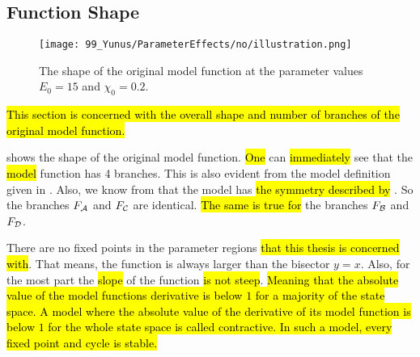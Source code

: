 \subsection{Function Shape}

\begin{figure}
	\centering
	\texttt{[image: 99\_Yunus/ParameterEffects/no/illustration.png]}
	\caption[Shape of the original model function]{
		The shape of the original model function at the parameter values $E_0 = 15$ and $\chi_0 = 0.2$.
	}
	\label{fig:setup.char.shape}
\end{figure}

\hl{
	This section is concerned with the overall shape and number of branches of the original model function.
}

 shows the shape of the original model function.
\hl{One} can \hl{immediately} see that the \hl{model} function has 4 branches.
This is also evident from the model definition given in .
Also, we know from  that the model has \hl{the symmetry described by} .
So the branches $F_{\mathcal{A}}$ and $F_{\mathcal{C}}$ are identical.
\hl{The same is true for} the branches $F_{\mathcal{B}}$ and $F_{\mathcal{D}}$.

There are no fixed points in the parameter regions \hl{that this thesis is concerned with}.
That means, the function is always larger than the bisector $y=x$.
Also, for the most part the \hl{slope} of the function \hl{is not steep}.
\hl{
	Meaning that the absolute value of the model functions derivative is below $1$ for a majority of the state space.
	A model where the absolute value of the derivative of its model function is below $1$ for the whole state space is called contractive.
	In such a model, every fixed point and cycle is stable.
}
